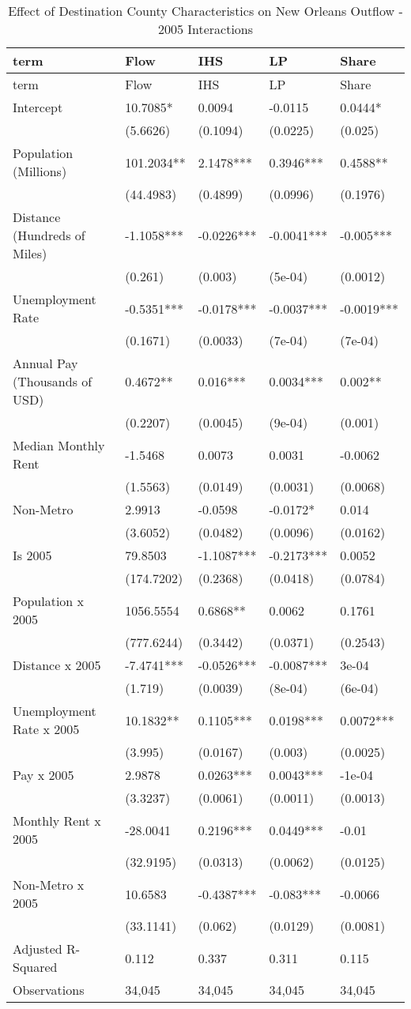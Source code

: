 \documentclass[]{article}
\begin{document}
\begin{longtable}[]{@{}lllll@{}}
\caption{\label{tab:reg2005}Effect of Destination County Characteristics
on New Orleans Outflow - 2005 Interactions}\tabularnewline
\toprule
term & Flow & IHS & LP & Share\tabularnewline
\midrule
\endfirsthead
\toprule
term & Flow & IHS & LP & Share\tabularnewline
\midrule
\endhead
Intercept & 10.7085* & 0.0094 & -0.0115 & 0.0444*\tabularnewline
& (5.6626) & (0.1094) & (0.0225) & (0.025)\tabularnewline
Population (Millions) & 101.2034** & 2.1478*** & 0.3946*** &
0.4588**\tabularnewline
& (44.4983) & (0.4899) & (0.0996) & (0.1976)\tabularnewline
Distance (Hundreds of Miles) & -1.1058*** & -0.0226*** & -0.0041*** &
-0.005***\tabularnewline
& (0.261) & (0.003) & (5e-04) & (0.0012)\tabularnewline
Unemployment Rate & -0.5351*** & -0.0178*** & -0.0037*** &
-0.0019***\tabularnewline
& (0.1671) & (0.0033) & (7e-04) & (7e-04)\tabularnewline
Annual Pay (Thousands of USD) & 0.4672** & 0.016*** & 0.0034*** &
0.002**\tabularnewline
& (0.2207) & (0.0045) & (9e-04) & (0.001)\tabularnewline
Median Monthly Rent & -1.5468 & 0.0073 & 0.0031 & -0.0062\tabularnewline
& (1.5563) & (0.0149) & (0.0031) & (0.0068)\tabularnewline
Non-Metro & 2.9913 & -0.0598 & -0.0172* & 0.014\tabularnewline
& (3.6052) & (0.0482) & (0.0096) & (0.0162)\tabularnewline
Is 2005 & 79.8503 & -1.1087*** & -0.2173*** & 0.0052\tabularnewline
& (174.7202) & (0.2368) & (0.0418) & (0.0784)\tabularnewline
Population x 2005 & 1056.5554 & 0.6868** & 0.0062 &
0.1761\tabularnewline
& (777.6244) & (0.3442) & (0.0371) & (0.2543)\tabularnewline
Distance x 2005 & -7.4741*** & -0.0526*** & -0.0087*** &
3e-04\tabularnewline
& (1.719) & (0.0039) & (8e-04) & (6e-04)\tabularnewline
Unemployment Rate x 2005 & 10.1832** & 0.1105*** & 0.0198*** &
0.0072***\tabularnewline
& (3.995) & (0.0167) & (0.003) & (0.0025)\tabularnewline
Pay x 2005 & 2.9878 & 0.0263*** & 0.0043*** & -1e-04\tabularnewline
& (3.3237) & (0.0061) & (0.0011) & (0.0013)\tabularnewline
Monthly Rent x 2005 & -28.0041 & 0.2196*** & 0.0449*** &
-0.01\tabularnewline
& (32.9195) & (0.0313) & (0.0062) & (0.0125)\tabularnewline
Non-Metro x 2005 & 10.6583 & -0.4387*** & -0.083*** &
-0.0066\tabularnewline
& (33.1141) & (0.062) & (0.0129) & (0.0081)\tabularnewline
Adjusted R-Squared & 0.112 & 0.337 & 0.311 & 0.115\tabularnewline
Observations & 34,045 & 34,045 & 34,045 & 34,045\tabularnewline
\bottomrule
\end{longtable}
\end{document}
